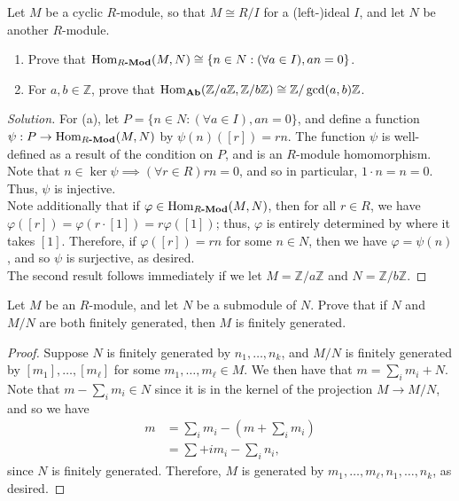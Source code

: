 \documentclass[12pt]{article}
\newenvironment{problem}[2][Problem]{\begin{trivlist}
\item[\hskip \labelsep {\bfseries #1}\hskip \labelsep {\bfseries #2.}]}{\end{trivlist}}
\newcommand{\catname}[1]{\normalfont\textbf{#1}}
\newcommand{\Hom}{\text{Hom}}
\newcommand{\Homc}[2]{\Hom_{\catname{#1}}(#2)}
\newcommand{\Homod}[2]{\Hom_{#1\catname{-Mod}}(#2)}
\newcommand{\Z}{\mathbb{Z}}
\newenvironment{solution}
  {\renewcommand\qedsymbol{$\blacksquare$}\begin{proof}[Solution]}
{\end{proof}}
\theoremstyle{remark}
\begin{document}
\begin{problem}{6.17}
  Let $M$ be a cyclic $R$-module, so that $M\cong R/I$ for a (left-)ideal
  $I$, and let $N$ be another $R$-module.
  \begin{enumerate}[label=(\alph*)]
    \item Prove that $\Homod{R}{M,N}\cong\{n\in N:(\forall a\in I),an=0\}$.
    \item For $a,b\in\Z$, prove that 
      $\Homc{Ab}{\Z/a\Z,\Z/b\Z}\cong\Z/\gcd(a,b)\Z$.
  \end{enumerate}
\end{problem}
\begin{solution}
  For (a), let $P=\{n\in N:(\forall a\in I),an=0\}$, and define a function
  $\psi:P\to\Homod{R}{M,N}$ by $\psi(n)([r])=rn$.
  The function $\psi$ is well-defined as a result of the condition on $P$,
  and is an $R$-module homomorphism.
  Note that $n\in\ker\psi\implies(\forall r\in R)rn=0$, and so in particular,
  $1\cdot n=n=0$.
  Thus, $\psi$ is injective. \\
  \indent Note additionally that if $\varphi\in \Homod{R}{M,N}$, then for all
  $r\in R$, we have $\varphi([r])=\varphi(r\cdot[1])=r\varphi([1])$;
  thus, $\varphi$ is entirely determined by where it takes $[1]$.
  Therefore, if $\varphi([r])=rn$ for some $n\in N$, then we have
  $\varphi=\psi(n)$, and so $\psi$ is surjective, as desired. \\
  \indent The second result follows immediately if we let $M=\Z/a\Z$ and
  $N=\Z/b\Z$.
\end{solution}

\begin{problem}{6.18}
  Let $M$ be an $R$-module, and let $N$ be a submodule of $N$.
  Prove that if $N$ and $M/N$ are both finitely generated, then $M$
  is finitely generated.
\end{problem}
\begin{proof}
  Suppose $N$ is finitely generated by $n_1,\dots,n_k$,
  and $M/N$ is finitely generated by $[m_1],\dots,[m_\ell]$ for some 
  $m_1,\dots,m_\ell\in M$.
  We then have that $m=\sum_i m_i+N$. Note that $m-\sum_i m_i\in N$ since
  it is in the kernel of the projection $M\to M/N$, and so we have
  \begin{align*}
    m &= \sum_im_i - \left(m+\sum_im_i\right) \\
    &= \sum+im_i - \sum_in_i,
  \end{align*}
  since $N$ is finitely generated.
  Therefore, $M$ is generated by $m_1,\dots,m_\ell,n_1,\dots,n_k$, as desired.
\end{proof}
\end{document}

